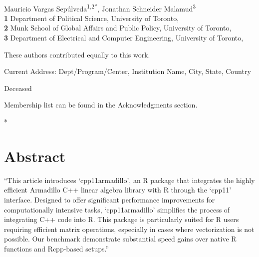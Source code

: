 \documentclass[
  10pt,
  letterpaper,
]{article}
\begin{document}
\vspace*{0.2in}

\begin{flushleft}
{\Large
\textbf{} %
}
\newline
\\
Mauricio Vargas Sepúlveda\textsuperscript{1,2*}, Jonathan Schneider
Malamud\textsuperscript{3}
\\
\bigskip
\textbf{1} Department of Political Science, University of
Toronto, \\ \textbf{2} Munk School of Global Affairs and Public Policy,
University of Toronto, \\ \textbf{3} Department of Electrical and
Computer Engineering, University of Toronto, 
\bigskip

% 
%
\Yinyang These authors contributed equally to this work.


\textcurrency Current Address: Dept/Program/Center, Institution Name, City, State, Country %

\dag Deceased

\textpilcrow Membership list can be found in the Acknowledgments section.

* 

\end{flushleft}

\section*{Abstract}
``This article introduces `cpp11armadillo', an R package that integrates
the highly efficient Armadillo C++ linear algebra library with R through
the `cpp11' interface. Designed to offer significant performance
improvements for computationally intensive tasks, `cpp11armadillo'
simplifies the process of integrating C++ code into R. This package is
particularly suited for R users requiring efficient matrix operations,
especially in cases where vectorization is not possible. Our benchmark
demonstrate substantial speed gains over native R functions and
Rcpp-based setups.''
\end{document}
